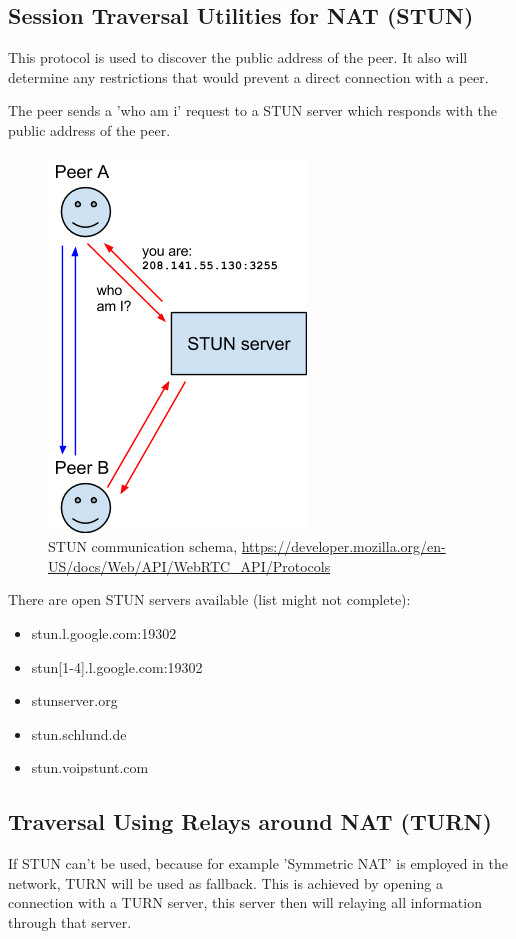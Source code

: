 \subsection{Session Traversal Utilities for NAT (STUN)}
This protocol is used to discover the public address of the peer. It also will determine any restrictions that would prevent a direct connection with a peer.

The peer sends a 'who am i' request to a STUN server which responds with the public address of the peer.

\begin{figure}[H]
	\includegraphics[scale=0.5]{images/webrtc-stun.png}
	\centering
	\caption{STUN communication schema, \url{https://developer.mozilla.org/en-US/docs/Web/API/WebRTC_API/Protocols}}
	\label{fig:STUN}
\end{figure}

There are open STUN servers available (list might not complete):
\begin{itemize}
	\item stun.l.google.com:19302
	\item stun[1-4].l.google.com:19302
	\item stunserver.org
	\item stun.schlund.de
	\item stun.voipstunt.com
\end{itemize}

\subsection{Traversal Using Relays around NAT (TURN)}
If STUN can't be used, because for example 'Symmetric NAT' is employed in the network, TURN will be used as fallback. This is achieved by opening a connection with a TURN server, this server then will relaying all information through that server.

